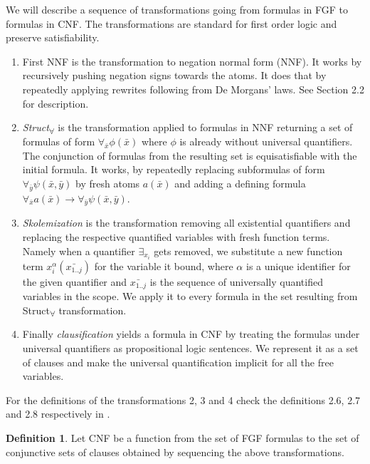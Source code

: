 \documentclass[english, shortabstract]{iithesis}
\theoremstyle{definition} \newtheorem{definition}{Definition}[chapter]
\theoremstyle{remark} \newtheorem{remark}[definition]{Observation}
\theoremstyle{plain} \newtheorem{theorem}[definition]{Theorem}
\theoremstyle{plain} \newtheorem{lemma}[definition]{Lemma}
\begin{document}
We will describe a sequence of transformations going from formulas in FGF to formulas in CNF.
The transformations are standard for first order logic and preserve satisfiability.
\begin{enumerate}
    \item First NNF is the transformation to negation normal form (NNF). 
    It works by recursively pushing negation signs towards the atoms.
    It does that by repeatedly applying rewrites following from De Morgans' laws. 
    See \cite{resolution book} Section 2.2 for description.
    \item \emph{Struct\textsubscript{{$\forall$}}} is the transformation applied to formulas in NNF returning a set of formulas of form $\forall_{\bar{x}}\phi(\bar{x})$ where $\phi$ is already without universal quantifiers.
    The conjunction of formulas from the resulting set is equisatisfiable with the initial formula.
    It works, by repeatedly replacing subformulas of form $\forall_{\bar{y}} \psi(\bar{x},\bar{y})$ 
    by fresh atoms $a(\bar{x})$ and adding a defining formula $\forall_{\bar{x}} a(\bar{x}) \rightarrow \forall_{\bar{y}} \psi(\bar{x},\bar{y})$.
    \item \emph{Skolemization} is the transformation removing all existential quantifiers and replacing the respective quantified variables with fresh function terms.
    Namely when a quantifier $\exists_{x_i}$ gets removed, we substitute a new function term $x_i^{\alpha}(\bar{x_{1..j}})$ for the variable it bound, 
    where $\alpha$ is a unique identifier for the given quantifier and $\bar{x_{1..j}}$ is the sequence of universally quantified variables in the scope.
    We apply it to every formula in the set resulting from Struct\textsubscript{{$\forall$}} transformation.
    \item Finally \emph{clausification} yields a formula in CNF by treating the formulas under universal quantifiers as propositional logic sentences.
    We represent it as a set of clauses and make the universal quantification implicit for all the free variables. 
\end{enumerate}

For the definitions of the transformations 2, 3 and 4 check the definitions 2.6, 2.7 and 2.8 respectively in \cite{resolution GF}.

\begin{definition}
Let CNF be a function from the set of FGF formulas to the set of conjunctive sets of clauses obtained by sequencing the above transformations.
\end{definition}
\end{document}
